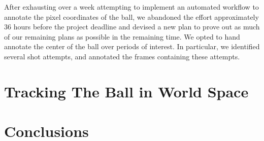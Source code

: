 \documentclass{article}
\begin{document}
After exhausting over a week attempting to implement an automated workflow to 
annotate the pixel coordinates of the ball, we abandoned the effort approximately
36 hours before the project deadline and devised a new plan to prove out as much
of our remaining plans as possible in the remaining time.
We opted to hand annotate the center of the ball over periods of interest.
In particular, we identified several shot attempts, and annotated the frames
containing these attempts.

\newpage
\section{Tracking The Ball in World Space}

\newpage
\section{Conclusions}
\end{document}
